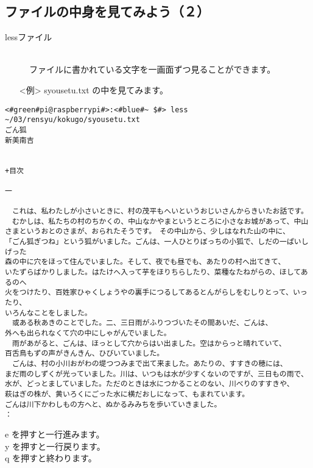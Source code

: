 \subsection{ファイルの中身を見てみよう（２）}
\begin{description}
\item[less\textvisiblespace ファイル]\mbox{}\\
ファイルに書かれている文字を一画面ずつ見ることができます。
\end{description}
\begin{itemize}
\item[<例>]syousetu.txt の中を見てみます。
\end{itemize}
\begin{lstlisting}[caption=lessの例, label=less]
<#green#pi@raspberrypi#>:<#blue#~ $#> less ~/03/rensyu/kokugo/syousetu.txt
ごん狐
新美南吉


+目次

一

　これは、私わたしが小さいときに、村の茂平もへいというおじいさんからきいたお話です。
　むかしは、私たちの村のちかくの、中山なかやまというところに小さなお城があって、中山
さまというおとのさまが、おられたそうです。　その中山から、少しはなれた山の中に、
「ごん狐ぎつね」という狐がいました。ごんは、一人ひとりぼっちの小狐で、しだの一ぱいしげった
森の中に穴をほって住んでいました。そして、夜でも昼でも、あたりの村へ出てきて、
いたずらばかりしました。はたけへ入って芋をほりちらしたり、菜種なたねがらの、ほしてあるのへ
火をつけたり、百姓家ひゃくしょうやの裏手につるしてあるとんがらしをむしりとって、いったり、
いろんなことをしました。
　或ある秋あきのことでした。二、三日雨がふりつづいたその間あいだ、ごんは、
外へも出られなくて穴の中にしゃがんでいました。
　雨があがると、ごんは、ほっとして穴からはい出ました。空はからっと晴れていて、
百舌鳥もずの声がきんきん、ひびいていました。
　ごんは、村の小川おがわの堤つつみまで出て来ました。あたりの、すすきの穂には、
まだ雨のしずくが光っていました。川は、いつもは水が少すくないのですが、三日もの雨で、
水が、どっとましていました。ただのときは水につかることのない、川べりのすすきや、
萩はぎの株が、黄いろくにごった水に横だおしになって、もまれています。
ごんは川下かわしもの方へと、ぬかるみみちを歩いていきました。
：
\end{lstlisting}
e を押すと一行進みます。\\
y を押すと一行戻ります。\\
q を押すと終わります。\\
\begin{tcolorbox}[title=\useOmetoi]
\begin{enumerate}
\end{enumerate}
\end{tcolorbox}
